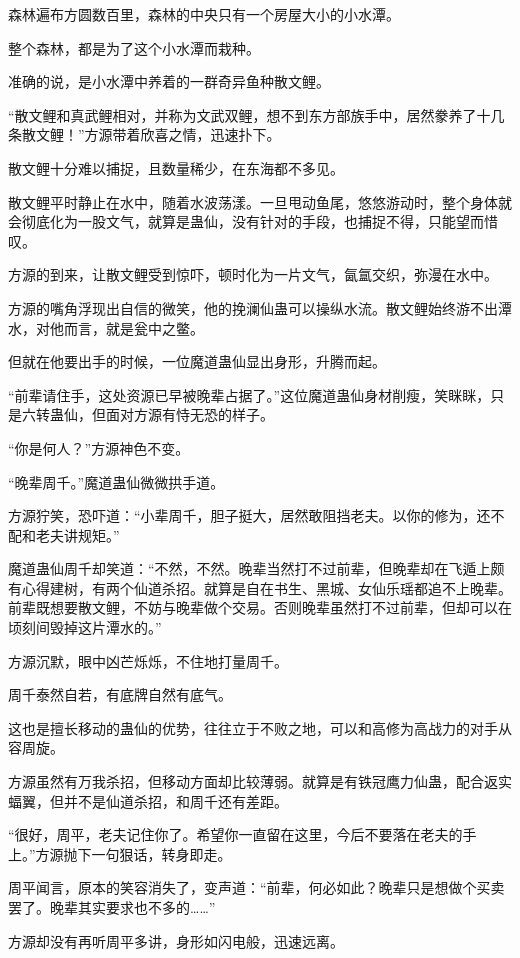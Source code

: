 \begin{this_body}
森林遍布方圆数百里，森林的中央只有一个房屋大小的小水潭。

整个森林，都是为了这个小水潭而栽种。

准确的说，是小水潭中养着的一群奇异鱼种散文鲤。

“散文鲤和真武鲤相对，并称为文武双鲤，想不到东方部族手中，居然豢养了十几条散文鲤！”方源带着欣喜之情，迅速扑下。

散文鲤十分难以捕捉，且数量稀少，在东海都不多见。

散文鲤平时静止在水中，随着水波荡漾。一旦甩动鱼尾，悠悠游动时，整个身体就会彻底化为一股文气，就算是蛊仙，没有针对的手段，也捕捉不得，只能望而惜叹。

方源的到来，让散文鲤受到惊吓，顿时化为一片文气，氤氲交织，弥漫在水中。

方源的嘴角浮现出自信的微笑，他的挽澜仙蛊可以操纵水流。散文鲤始终游不出潭水，对他而言，就是瓮中之鳖。

但就在他要出手的时候，一位魔道蛊仙显出身形，升腾而起。

“前辈请住手，这处资源已早被晚辈占据了。”这位魔道蛊仙身材削瘦，笑眯眯，只是六转蛊仙，但面对方源有恃无恐的样子。

“你是何人？”方源神色不变。

“晚辈周千。”魔道蛊仙微微拱手道。

方源狞笑，恐吓道：“小辈周千，胆子挺大，居然敢阻挡老夫。以你的修为，还不配和老夫讲规矩。”

魔道蛊仙周千却笑道：“不然，不然。晚辈当然打不过前辈，但晚辈却在飞遁上颇有心得建树，有两个仙道杀招。就算是自在书生、黑城、女仙乐瑶都追不上晚辈。前辈既想要散文鲤，不妨与晚辈做个交易。否则晚辈虽然打不过前辈，但却可以在顷刻间毁掉这片潭水的。”

方源沉默，眼中凶芒烁烁，不住地打量周千。

周千泰然自若，有底牌自然有底气。

这也是擅长移动的蛊仙的优势，往往立于不败之地，可以和高修为高战力的对手从容周旋。

方源虽然有万我杀招，但移动方面却比较薄弱。就算是有铁冠鹰力仙蛊，配合返实蝠翼，但并不是仙道杀招，和周千还有差距。

“很好，周平，老夫记住你了。希望你一直留在这里，今后不要落在老夫的手上。”方源抛下一句狠话，转身即走。

周平闻言，原本的笑容消失了，变声道：“前辈，何必如此？晚辈只是想做个买卖罢了。晚辈其实要求也不多的……”

方源却没有再听周平多讲，身形如闪电般，迅速远离。


\end{this_body}
